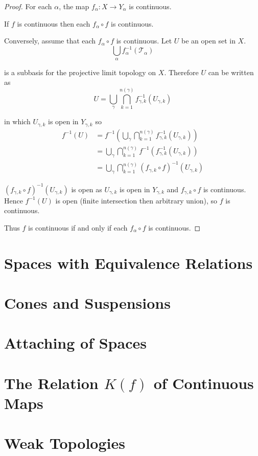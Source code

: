 \begin{proof}
	For each \( \alpha \), the map \( f_{\alpha}: X \to Y_{\alpha} \) is continuous.

	If \( f \) is continuous then each \( f_{\alpha} \circ f \) is continuous.

	Conversely, assume that each \( f_{\alpha} \circ f \) is continuous. Let \( U \) be an open set in \( X \).
	\[
		\bigcup_{\alpha} f_{\alpha}^{-1}(\mathscr{T}_{\alpha})
	\]

	is a subbasis for the projective limit topology on \( X \). Therefore \( U \) can be written as
	\[
		U = \bigcup_{\gamma} \bigcap^{n(\gamma)}_{k=1} f_{\gamma,k}^{-1}(U_{\gamma,k})
	\]

	in which \( U_{\gamma,k} \) is open in \( Y_{\gamma,k} \) so
	\begingroup
	\allowdisplaybreaks%
	\begin{align*}
		f^{-1}(U) & = f^{-1}\left( \bigcup_{\gamma} \bigcap^{n(\gamma)}_{k=1} f_{\gamma,k}^{-1}(U_{\gamma,k}) \right) \\
		          & = \bigcup_{\gamma} \bigcap^{n(\gamma)}_{k=1} f^{-1}(f_{\gamma,k}^{-1}(U_{\gamma,k}))              \\
		          & = \bigcup_{\gamma} \bigcap^{n(\gamma)}_{k=1} {(f_{\gamma,k} \circ f)}^{-1}(U_{\gamma,k})
	\end{align*}
	\endgroup

	\( {(f_{\gamma,k} \circ f)}^{-1}(U_{\gamma,k}) \) is open as \( U_{\gamma,k} \) is open in \( Y_{\gamma,k} \) and \( f_{\gamma,k} \circ f \) is continuous. Hence \( f^{-1}(U) \) is open (finite intersection then arbitrary union), so \( f \) is continuous.

	Thus \( f \) is continuous if and only if each \( f_{\alpha} \circ f \) is continuous.
\end{proof}

\section{Spaces with Equivalence Relations}

\section{Cones and Suspensions}

\section{Attaching of Spaces}

\section{The Relation \(K(f)\) of Continuous Maps}

\section{Weak Topologies}
